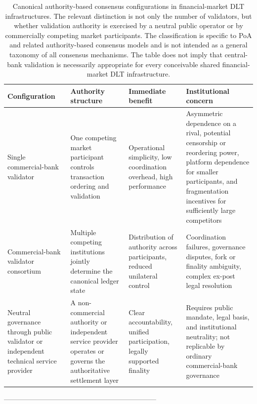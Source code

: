 \documentclass[
reprint,
showkeys,
superscriptaddress,
aps,
pra,
longbibliography,
nofootinbib,
]{revtex4-2}
\theoremstyle{definition}\newtheorem{definition}{Definition}
\begin{document}
\begin{table}[ht]
	\centering
	\small
	\setlength{\tabcolsep}{8pt} %
	
	\begin{tabularx}{\textwidth}{p{} p{} p{} X}
		\toprule
		\textbf{Configuration} & \textbf{Authority structure} & \textbf{Immediate benefit} & \textbf{Institutional concern} \\
		\hline\hline \addlinespace
		Single commercial-bank validator 
		& One competing market participant controls transaction ordering and validation 
		& Operational simplicity, low coordination overhead, high performance 
		& Asymmetric dependence on a rival, potential censorship or reordering power, platform dependence for smaller participants, and fragmentation incentives for sufficiently large competitors \\
		\midrule
		Commercial-bank validator consortium 
		& Multiple competing institutions jointly determine the canonical ledger state 
		& Distribution of authority across participants, reduced unilateral control 
		& Coordination failures, governance disputes, fork or finality ambiguity, complex ex-post legal resolution \\
		\midrule
		Neutral governance through public validator or independent technical service provider
		& A non-commercial authority or independent service provider operates or governs the authoritative settlement layer 
		& Clear accountability, unified participation, legally supported finality 
		& Requires public mandate, legal basis, and institutional neutrality; not replicable by ordinary commercial-bank governance \\
		\hline\hline 
	\end{tabularx}
	\caption{Canonical authority-based consensus configurations in financial-market DLT infrastructures. The relevant distinction is not only the number of validators, but whether validation authority is exercised by a neutral public operator or by commercially competing market participants. The classification is specific to PoA and related authority-based consensus models and is not intended as a general taxonomy of all consensus mechanisms. The table does not imply that central-bank validation is necessarily appropriate for every conceivable shared financial-market DLT infrastructure.}
	\label{tab:poa-configurations}
\end{table}------------------------------------------------------------------
\end{document}
